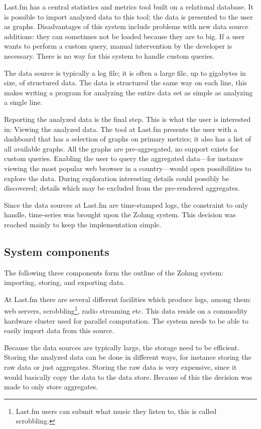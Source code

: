 Last.fm has a central statistics and metrics tool built on a relational
database. It is possible to import analyzed data to this tool; the data is
presented to the user as graphs. Disadvantages of this system include problems
with new data source additions: they can sometimes not be loaded because they
are to big. If a user wants to perform a custom query, manual intervention by
the developer is necessary. There is no way for this system to handle custom
queries.

The data source is typically a log file; it is often a large file, up to
gigabytes in size, of structured data. The data is structured the same way on
each line, this makes writing a program for analyzing the entire data set as
simple as analyzing a single line.

Reporting the analyzed data is the final step. This is what the user is
interested in: Viewing the analyzed data. The tool at Last.fm presents the user
with a dashboard that has a selection of graphs on primary metrics; it also has
a list of all available graphs. All the graphs are pre-aggregated, no support
exists for custom queries. Enabling the user to query the aggregated data---for
instance viewing the most popular web browser in a country---would open
possibilities to explore the data. During exploration interesting details could
possibly be discovered; details which may be excluded from the pre-rendered
aggregates.

Since the data sources at Last.fm are time-stamped logs, the constraint to only
handle, time-series was brought upon the Zohmg system. This decision was
reached mainly to keep the implementation simple.


\subsection*{System components}

The following three components form the outline of the Zohmg system: importing,
storing, and exporting data.

At Last.fm there are several different facilities which produce logs, among
them: web servers, scrobbling\footnote{Last.fm users can submit what music they
listen to, this is called scrobbling.}, radio streaming etc. This data reside
on a commodity hardware cluster used for parallel computation. The system needs
to be able to easily import data from this source.

Because the data sources are typically large, the storage need to be efficient.
Storing the analyzed data can be done in different ways, for instance storing
the raw data or just aggregates. Storing the raw data is very expensive, since
it would basically copy the data to the data store. Because of this the decision
was made to only store aggregates.

